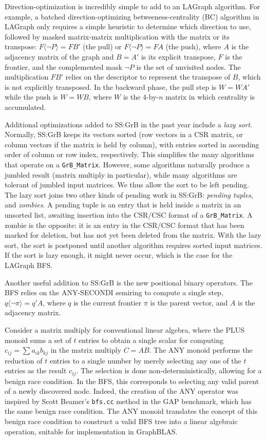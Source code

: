 Direction-optimization is incredibly simple to add to an LAGraph algorithm.
For example, a batched direction-optimizing betweeness-centrality (BC)
algorithm in LAGraph only requires a simple heuristic to determine which
direction to use, followed by masked matrix-matrix multiplication with the
matrix or its transpose: $F \langle \neg P \rangle =FB'$ (the pull) or $F
\langle \neg P \rangle =FA$ (the push), where $A$ is the adjacency matrix of
the graph and $B=A'$ is its explicit transpose, $F$ is the frontier, and the
complemented mask $\neg P$ is the set of unvisited nodes.  The multiplication
$FB'$ relies on the descriptor to represent the transpose of $B$, which is not
explicitly transposed.  In the backward phase, the pull step is $W=WA'$ while
the push is $W=WB$, where $W$ is the 4-by-$n$ matrix in which centrality is
accumulated.

Additional optimizations added to SS:GrB in the past year include a {\em lazy
sort}.  Normally, SS:GrB keeps its vectors sorted (row vectors in a CSR matrix,
or column vectors if the matrix is held by column), with entries sorted in
ascending order of column or row index, respectively.  This simplifies the many
algorithms that operate on a \verb'GrB_Matrix'.  However, some algorithms
naturally produce a jumbled result (matrix multiply in particular), while many
algorithms are tolerant of jumbled input matrices.  We thus allow the sort to
be left pending.  The lazy sort joins two other kinds of pending work in
SS:GrB: {\em pending tuples}, and {\em zombies}.  A pending tuple is an entry
that is held inside a matrix in an unsorted list, awaiting insertion into the
CSR/CSC format of a \verb'GrB_Matrix'.  A zombie is the opposite: it is an
entry in the CSR/CSC format that has been marked for deletion, but has not yet
been deleted from the matrix.  With the lazy sort, the sort is postponed until
another algorithm requires sorted input matrices.  If the sort is lazy enough,
it might never occur, which is the case for the LAGraph BFS.

Another useful addition to SS:GrB is the new positional binary operators.
The BFS relies on the ANY-SECONDI semiring to compute a single step,
$q \langle \neg \pi \rangle = q'A$, where $q$ is the current frontier
$\pi$ is the parent vector, and $A$ is the adjacency matrix.

Consider a matrix multiply for conventional linear algebra, where the PLUS
monoid sums a set of $t$ entries to obtain a single scalar for computing
$c_{ij} = \sum a_{ik} b_{kj}$ in the matrix multiply $C=AB$.  The ANY monoid
performs the reduction of $t$ entries to a single number by merely selecting
any one of the $t$ entries as the result $c_{ij}$.  The selection is done
non-deterministically, allowing for a benign race condition.  In the BFS, this
corresponds to selecting any valid parent of a newly discovered node.  Indeed,
the creation of the ANY operator was inspired by Scott Beamer's \verb'bfs.cc'
method in the GAP benchmark, which has the same benign race condition.  The ANY
monoid translates the concept of this benign race condition to construct a
valid BFS tree into a linear algebraic operation, suitable for implementation
in GraphBLAS.

